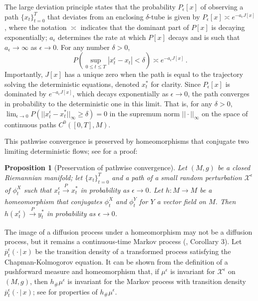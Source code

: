 \documentclass[12pt]{article}
\newtheorem{proposition}[theorem]{Proposition}
\begin{document}
The large deviation principle states that the probability $P_{\epsilon}[x]$ of observing a path $\{x_t \}_{t=0}^T$ that deviates from an enclosing $\delta$-tube is given by $P_{\epsilon}[x] \asymp e^{-a_{\epsilon}J[x]}$, where the notation $\asymp$ indicates that the dominant part of $P[x]$ is decaying exponentially; $a_{\epsilon}$ determines the rate at which $P[x]$ decays and is such that $a_{\epsilon} \rightarrow \infty$ as $\epsilon \rightarrow 0$. For any number $\delta > 0$,
\begin{equation*}
    P\left( \sup_{0\leq t \leq T} | x^{\epsilon}_t - x_t| < \delta \right ) \asymp e^{-a_{\epsilon}J[x]} \,.
\end{equation*}
Importantly, $J[x]$ has a unique zero when the path is equal to the trajectory solving the deterministic equations, denoted $x^*_t$ for clarity. Since $P_{\epsilon}[x]$ is dominated by $e^{-a_{\epsilon}J[x]}$, which decays exponentially as $\epsilon \rightarrow 0$, the path converges in probability to the deterministic one in this limit. That is, for any $\delta>0$, $\lim_{\epsilon \to 0} P\left(|| x^{\epsilon}_t - x^*_t||_{\infty}\geq\delta\right) = 0$ in the supremum norm $||\cdot||_{\infty}$ on the space of continuous paths $C^0([0,T],M)$. 

This pathwise convergence is preserved by homeomorphisms that conjugate two limiting deterministic flows; see  for a proof:

\begin{proposition}[Preservation of pathwise convergence]
\label{proposition:pathwise-convergence-preservation}
    Let $(M,g)$ be a closed Riemannian manifold; let $\{x_t\}_{t=0}^{T}$ and a path of a small random perturbation $\mathcal{X}^{\epsilon}$ of $\phi_t^X$ such that $x^{\epsilon}_t \xrightarrow[]{P} x^*_t$ in probability as $\epsilon \rightarrow 0$. Let $h:M \rightarrow M$ be a homeomorphism that conjugates $\phi_t^X$ and $\phi_t^Y$ for $Y$ a vector field on $M$. Then $h(x^{\epsilon}_t) \xrightarrow[]{P} y^*_t$ in probability as $\epsilon \rightarrow 0$.
\end{proposition}

The image of a diffusion process under a homeomorphism may not be a diffusion process, but it remains a continuous-time Markov process (\cite{burke1958markovian}, Corollary 3). Let $\overline{p}^{\epsilon}_t(\cdot \, | \, x)$ be the transition density of a transformed process satisfying the Chapman-Kolmogorov equation. It can be shown from the definition of a pushforward measure and homeomorphism that, if $\mu^{\epsilon}$ is invariant for $\mathcal{X}^{\epsilon}$ on $(M,g)$, then $h_{\#}\mu^{\epsilon}$ is invariant for the Markov process with transition density $\overline{p}^{\epsilon}_t(\cdot \, | \, x)$; see  for properties of $h_{\#}\mu^{\epsilon}$.
\end{document}
